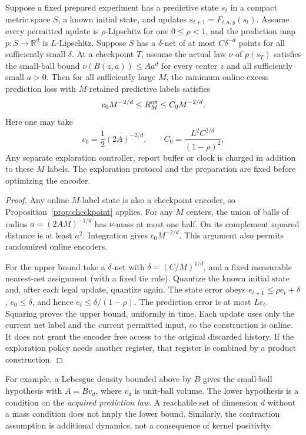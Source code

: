 \begin{theorem}\label{thm:online-resolution}
Suppose a fixed prepared experiment has a predictive state $s_t$ in a
compact metric space $S$, a known initial state, and updates
$s_{t+1}=F_{t,a,y}(s_t)$. Assume every permitted update is
$\rho$-Lipschitz for one $0\le\rho<1$, and the prediction map
$p:S\to\mathbb R^d$ is $L$-Lipschitz. Suppose $S$ has a $\delta$-net
of at most $C\delta^{-d}$ points for all sufficiently small $\delta$.
At a checkpoint $T$, assume the actual law $\nu$ of $p(s_T)$ satisfies
the small-ball bound $\nu(B(z,a))\le A a^d$ for every center $z$ and
all sufficiently small $a>0$.
Then for all sufficiently large $M$, the minimum online excess
prediction loss with $M$ retained predictive labels satisfies
\begin{equation}\label{eq:online-rate}
               c_0 M^{-2/d}\le R_M^{\rm on}\le C_0 M^{-2/d}.
\end{equation}
Here one may take
\[
 c_0=\frac12(2A)^{-2/d},
 \qquad C_0=\frac{L^2C^{2/d}}{(1-\rho)^2},
\]
Any separate exploration
controller, report buffer or clock is charged in addition to these
$M$ labels. The exploration protocol and the preparation are fixed
before optimizing the encoder.
\end{theorem}
\begin{proof}
Any online $M$-label state is also a checkpoint encoder, so
Proposition~\ref{prop:checkpoint} applies. For any $M$ centers, the union
of balls of radius $a=(2AM)^{-1/d}$ has $\nu$-mass at most one half.
On its complement squared distance is at least $a^2$. Integration
gives $c_0M^{-2/d}$.
This argument also permits randomized online encoders.

For the upper bound take a $\delta$-net with
$\delta=(C/M)^{1/d}$, and a fixed measurable nearest-net assignment
(with a fixed tie rule). Quantize the known initial state and, after
each legal update, quantize again. The state error obeys
$e_{t+1}\le\rho e_t+\delta$, $e_0\le\delta$, and hence
$e_t\le\delta/(1-\rho)$. The prediction error is at most $Le_t$.
Squaring proves the upper bound, uniformly in time. Each update uses
only the current net label and the current permitted input, so the
construction is online. It does not grant the encoder free access to
the original discarded history. If the exploration policy needs another
register, that register is combined by a product construction.
\end{proof}

For example, a Lebesgue density bounded above by $B$ gives the
small-ball hypothesis with $A=Bv_d$, where $v_d$ is unit-ball volume.
The lower hypothesis is a condition on the \emph{acquired prediction
law}. A reachable set of dimension $d$ without a mass condition does
not imply the lower bound. Similarly, the contraction assumption is
additional dynamics, not a consequence of kernel positivity.

